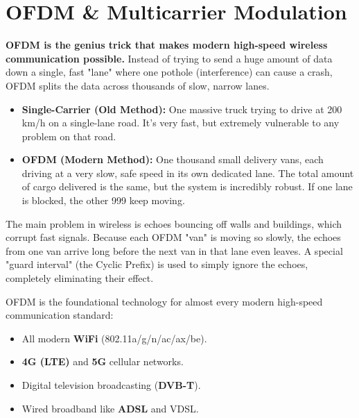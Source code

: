 
\chapter{OFDM \& Multicarrier Modulation}
\label{ch:ofdm}

\begin{nontechnical}
    \textbf{OFDM is the genius trick that makes modern high-speed wireless communication possible.} Instead of trying to send a huge amount of data down a single, fast "lane" where one pothole (interference) can cause a crash, OFDM splits the data across thousands of slow, narrow lanes.

    \begin{itemize}
        \item \textbf{Single-Carrier (Old Method):} One massive truck trying to drive at 200 km/h on a single-lane road. It's very fast, but extremely vulnerable to any problem on that road.
        \item \textbf{OFDM (Modern Method):} One thousand small delivery vans, each driving at a very slow, safe speed in its own dedicated lane. The total amount of cargo delivered is the same, but the system is incredibly robust. If one lane is blocked, the other 999 keep moving.
    \end{itemize}

    The main problem in wireless is echoes bouncing off walls and buildings, which corrupt fast signals. Because each OFDM "van" is moving so slowly, the echoes from one van arrive long before the next van in that lane even leaves. A special "guard interval" (the Cyclic Prefix) is used to simply ignore the echoes, completely eliminating their effect.

    OFDM is the foundational technology for almost every modern high-speed communication standard:
    \begin{itemize}
        \item All modern \textbf{WiFi} (802.11a/g/n/ac/ax/be).
        \item \textbf{4G (LTE)} and \textbf{5G} cellular networks.
        \item Digital television broadcasting (\textbf{DVB-T}).
        \item Wired broadband like \textbf{ADSL} and VDSL.
    \end{itemize}
\end{nontechnical}


